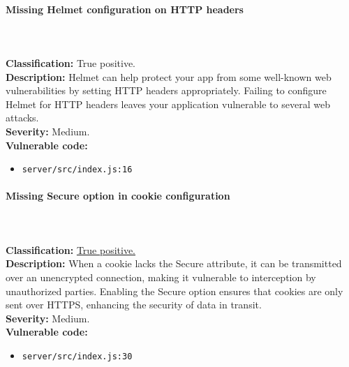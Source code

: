 \documentclass[]{article}
\begin{document}
\paragraph{Missing Helmet configuration on HTTP headers} \mbox{} \\ \\
\textbf{Classification:} True positive. \\
\textbf{Description:} Helmet can help protect your app from some well-known web vulnerabilities by setting HTTP headers appropriately. Failing to configure Helmet for HTTP headers leaves your application vulnerable to several web attacks. \\ 
\textbf{Severity:} Medium. \\ 
\textbf{Vulnerable code:}
\begin{itemize}
    \item \texttt{server/src/index.js:16}
\end{itemize}

\paragraph{Missing Secure option in cookie configuration} \mbox{} \\ \\
\textbf{Classification:} \hyperref[subsubsec:sensitive_cookie_without_secure_and_httponly_attributes]{True positive.} \\
\textbf{Description:} When a cookie lacks the Secure attribute, it can be transmitted over an unencrypted connection, making it vulnerable to interception by unauthorized parties. Enabling the Secure option ensures that cookies are only sent over HTTPS, enhancing the security of data in transit. \\ 
\textbf{Severity:} Medium. \\ 
\textbf{Vulnerable code:}
\begin{itemize}
    \item \texttt{server/src/index.js:30}
\end{itemize}
\end{document}
